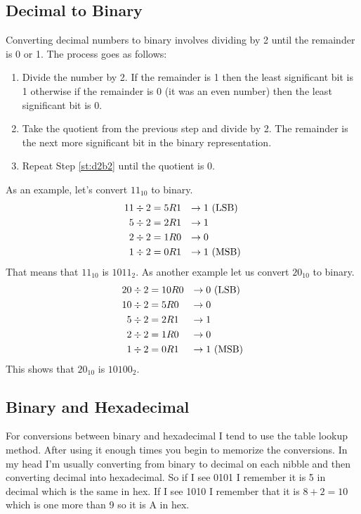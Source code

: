 \subsection{Decimal to Binary}
Converting decimal numbers to binary involves dividing by 2 until the remainder is 0 or 1. The process
goes as follows:
\begin{enumerate}
	\item  Divide the number by 2. If the remainder is 1 then the least significant bit is 1 otherwise if the remainder is 0 
	(it was an even number) then the least significant bit is 0.
	\item \label{st:d2b2}Take the quotient from the previous step and divide by 2. The remainder is the next more significant bit in the binary representation.
	\item Repeat Step \ref{st:d2b2} until the quotient is 0.
\end{enumerate}

As an example, let's convert $11_{10}$ to binary. 
\begin{equation}
	\begin{aligned}
		11 \divisionsymbol 2 & = 5R1 &\rightarrow 1 &\mathrm{~(LSB)} \\
		5 \divisionsymbol 2 & = 2R1 &\rightarrow 1 \\
		2 \divisionsymbol 2 & = 1R0 &\rightarrow 0 \\
		1 \divisionsymbol 2 & = 0R1 &\rightarrow 1 & \mathrm{~(MSB)}
	\end{aligned}
\end{equation}
That means that $11_{10}$ is $1011_2$. As another example let us convert $20_{10}$ to binary.
\begin{equation}
	\begin{aligned}
		20 \divisionsymbol 2 & = 10R0 &\rightarrow 0 &\mathrm{~(LSB)}\\
		10 \divisionsymbol 2 & = 5R0  &\rightarrow 0 \\
		5 \divisionsymbol 2 &  = 2R1  &\rightarrow 1 \\
		2 \divisionsymbol 2 &  = 1R0  &\rightarrow 0 \\
		1 \divisionsymbol 2 &  = 0R1  &\rightarrow 1 & \mathrm{~(MSB)}
	\end{aligned}
\end{equation}
This shows that $20_{10}$ is $10100_2$.

\subsection{Binary and Hexadecimal}
For conversions between binary and hexadecimal I tend to use the table lookup method. After using it 
enough times you begin to memorize the conversions. In my head I'm usually converting from binary to 
decimal on each nibble and then converting decimal into hexadecimal. So if I see 0101 I remember it 
is 5 in decimal which is the same in hex. If I see 1010 I remember that it is $8 + 2 = 10$ which is 
one more than 9 so it is A in hex.

